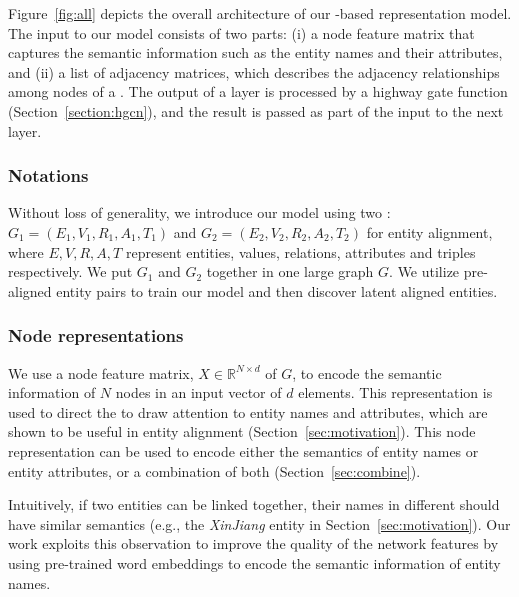     Figure~\ref{fig:all} depicts the overall architecture of our \RGCN-based \KG representation model. 	
  	The input to our model consists of two parts: (i) a node feature matrix that captures the semantic information such as the entity
  names and their attributes, and (ii) a list of adjacency matrices, which describes the adjacency relationships among nodes of a \KG.
    The output of a \RGCN layer is processed by a highway gate function (Section~\ref{section:hgcn}), and the result is passed as part of
    the input to the next layer.

\subsubsection{Notations}

Without loss of generality, we introduce our model using two \KGs: $G_1 = (E_1,V_1,R_1,A_1,T_1)$ and $G_2 = (E_2,V_2,R_2,A_2,T_2)$ for
entity alignment, where $E,V,R,A,T$ represent entities, values, relations, attributes and triples respectively. 	We put $G_1$ and $G_2$
together in one large graph $G$. We utilize pre-aligned entity pairs to train our model and then discover latent aligned entities.

%



\subsubsection{Node representations}
	\label{subsection:Node Representations}
   We use a node feature matrix, $X \in \mathbb{R}^{N \times d}$ of $G$, to encode the semantic information of $N$  nodes in an
   input vector of $d$ elements. This representation is used to direct the \RGCN to draw attention to entity names and attributes, which are shown to be
   useful in entity alignment (Section~\ref{sec:motivation}). This node representation can be used to encode either the semantics of entity names
   or entity attributes, or a combination of both (Section~\ref{sec:combine}).


	
	\label{wordvector}
	Intuitively, if two entities can be linked together, their names in different \KGs should have similar semantics (e.g., the \emph{XinJiang} entity in Section~\ref{sec:motivation}).
    Our work exploits this observation to improve the quality of the network features by using pre-trained word embeddings to encode the semantic
    information of entity names.

